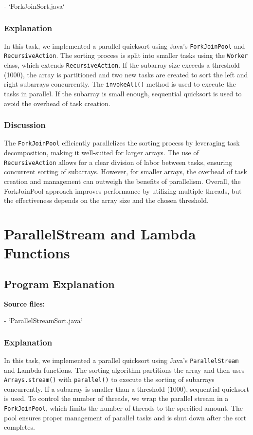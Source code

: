 \documentclass{article}
\begin{document}
- `ForkJoinSort.java`

\subsubsection{Explanation}
In this task, we implemented a parallel quicksort using Java's \texttt{ForkJoinPool} and \texttt{RecursiveAction}. The sorting process is split into smaller tasks using the \texttt{Worker} class, which extends \texttt{RecursiveAction}. If the subarray size exceeds a threshold (1000), the array is partitioned and two new tasks are created to sort the left and right subarrays concurrently. The \texttt{invokeAll()} method is used to execute the tasks in parallel. If the subarray is small enough, sequential quicksort is used to avoid the overhead of task creation.

\subsubsection{Discussion}
The \texttt{ForkJoinPool} efficiently parallelizes the sorting process by leveraging task decomposition, making it well-suited for larger arrays. The use of \texttt{RecursiveAction} allows for a clear division of labor between tasks, ensuring concurrent sorting of subarrays. However, for smaller arrays, the overhead of task creation and management can outweigh the benefits of parallelism. Overall, the ForkJoinPool approach improves performance by utilizing multiple threads, but the effectiveness depends on the array size and the chosen threshold.


\newpage
\section{ParallelStream and Lambda Functions}

\subsection{Program Explanation}
\textbf{Source files:}

- `ParallelStreamSort.java`

\subsubsection{Explanation}
In this task, we implemented a parallel quicksort using Java's \texttt{ParallelStream} and Lambda functions. The sorting algorithm partitions the array and then uses \texttt{Arrays.stream()} with \texttt{parallel()} to execute the sorting of subarrays concurrently. If a subarray is smaller than a threshold (1000), sequential quicksort is used. To control the number of threads, we wrap the parallel stream in a \texttt{ForkJoinPool}, which limits the number of threads to the specified amount. The pool ensures proper management of parallel tasks and is shut down after the sort completes.
\end{document}
